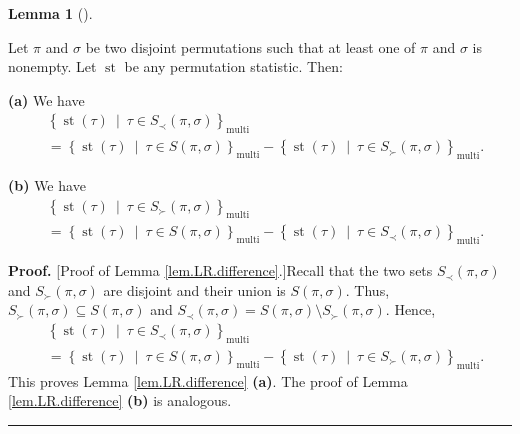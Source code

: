\documentclass[numbers=enddot,12pt,final,onecolumn,notitlepage]{scrartcl}%
\theoremstyle{definition}
\newtheorem{lem}[theo]{Lemma}
\newenvironment{lemma}[1][]
{\begin{lem}[#1]\begin{leftbar}}
{\end{leftbar}\end{lem}}
\newenvironment{proof}[1][Proof]{\noindent\textbf{#1.} }{\ \rule{0.5em}{0.5em}}
\begin{document}
\begin{lemma}
\label{lem.LR.difference}Let $\pi$ and $\sigma$ be two disjoint permutations
such that at least one of $\pi$ and $\sigma$ is nonempty. Let
$\operatorname*{st}$ be any permutation statistic. Then:

\textbf{(a)} We have%
\begin{align*}
&  \left\{  \operatorname*{st}\left(  \tau\right)  \ \mid\ \tau\in S_{\prec
}\left(  \pi,\sigma\right)  \right\}  _{\operatorname*{multi}}\\
&  =\left\{  \operatorname*{st}\left(  \tau\right)  \ \mid\ \tau\in S\left(
\pi,\sigma\right)  \right\}  _{\operatorname*{multi}}-\left\{
\operatorname*{st}\left(  \tau\right)  \ \mid\ \tau\in S_{\succ}\left(
\pi,\sigma\right)  \right\}  _{\operatorname*{multi}}.
\end{align*}


\textbf{(b)} We have%
\begin{align*}
&  \left\{  \operatorname*{st}\left(  \tau\right)  \ \mid\ \tau\in S_{\succ
}\left(  \pi,\sigma\right)  \right\}  _{\operatorname*{multi}}\\
&  =\left\{  \operatorname*{st}\left(  \tau\right)  \ \mid\ \tau\in S\left(
\pi,\sigma\right)  \right\}  _{\operatorname*{multi}}-\left\{
\operatorname*{st}\left(  \tau\right)  \ \mid\ \tau\in S_{\prec}\left(
\pi,\sigma\right)  \right\}  _{\operatorname*{multi}}.
\end{align*}

\end{lemma}

\begin{proof}
[Proof of Lemma \ref{lem.LR.difference}.]Recall that the two sets $S_{\prec
}\left(  \pi,\sigma\right)  $ and $S_{\succ}\left(  \pi,\sigma\right)  $ are
disjoint and their union is $S\left(  \pi,\sigma\right)  $. Thus, $S_{\succ
}\left(  \pi,\sigma\right)  \subseteq S\left(  \pi,\sigma\right)  $ and
$S_{\prec}\left(  \pi,\sigma\right)  =S\left(  \pi,\sigma\right)  \setminus
S_{\succ}\left(  \pi,\sigma\right)  $. Hence,%
\begin{align*}
&  \left\{  \operatorname*{st}\left(  \tau\right)  \ \mid\ \tau\in S_{\prec
}\left(  \pi,\sigma\right)  \right\}  _{\operatorname*{multi}}\\
&  =\left\{  \operatorname*{st}\left(  \tau\right)  \ \mid\ \tau\in S\left(
\pi,\sigma\right)  \right\}  _{\operatorname*{multi}}-\left\{
\operatorname*{st}\left(  \tau\right)  \ \mid\ \tau\in S_{\succ}\left(
\pi,\sigma\right)  \right\}  _{\operatorname*{multi}}.
\end{align*}
This proves Lemma \ref{lem.LR.difference} \textbf{(a)}. The proof of Lemma
\ref{lem.LR.difference} \textbf{(b)} is analogous.
\end{proof}
\end{document}
